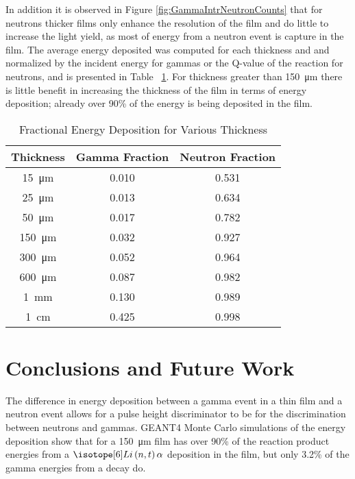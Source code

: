 \documentclass[draftcls,onecolumn]{IEEEtran}
\begin{document}
In addition it is observed in Figure \ref{fig:GammaIntrNeutronCounts} that for neutrons thicker films only enhance the resolution of the film and do little to increase the light yield, as most of energy from a neutron event is capture in the film.
The average energy deposited was computed for each thickness and and normalized by the incident energy for gammas or the Q-value of the reaction for neutrons, and is presented in Table ~\ref{tab:FractionEDep}.
For thickness greater than \SI{150}{\um} there is little benefit in increasing the thickness of the film in terms of energy deposition; already over 90\% of the energy is being deposited in the film.
\begin{table}[ht]
    \caption{Fractional Energy Deposition for Various Thickness}
	\centering
	\begin{tabular}{c | c c}
	Thickness & Gamma Fraction & Neutron Fraction \\
	\hline
	\hline
	\SI{15}{\um} & 0.010 & 0.531 \\
	\SI{25}{\um} & 0.013 & 0.634 \\
	\SI{50}{\um} & 0.017 & 0.782 \\
	\SI{150}{\um} & 0.032 & 0.927 \\
	\SI{300}{\um} & 0.052 & 0.964 \\
	\SI{600}{\um} & 0.087 & 0.982 \\
	\SI{1}{\mm} & 0.130 & 0.989 \\
	\SI{1}{\cm} & 0.425 & 0.998 \\
	\end{tabular}
  \label{tab:FractionEDep}
\end{table}

\section{Conclusions and Future Work}
\label{sec:Conclusions}

The difference in energy deposition between a gamma event in a thin film and a neutron event allows for a pulse height discriminator to be for the discrimination between neutrons and gammas.
GEANT4 Monte Carlo simulations of the energy deposition show that for a \SI{150}{\um} film has over 90\% of the reaction product energies from a $\iso[6]{Li}\left(n,t\right)\alpha$ deposition in the film, but only 3.2\% of the gamma energies from a  decay do.
\end{document}
